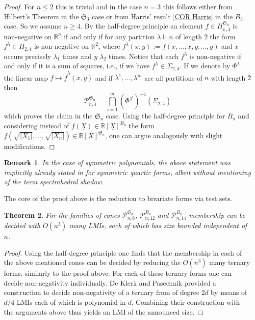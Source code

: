 \documentclass[11pt,a4paper]{amsart}
\numberwithin{equation}{section}
\newtheorem{thm}{Theorem}
\newtheorem{remark}[thm]{Remark}
\theoremstyle{definition}
\newcommand{\R}{\mathbb{R}}
\numberwithin{thm}{section}
\theoremstyle{break}
\numberwithin{subcase}{case}
\begin{document}
\begin{proof}
For $n \leq 2$ this is trivial and in the case $n=3$ this follows either from Hilbert's Theorem in the $\mathfrak{S}_3$ case or from Harris' result \ref{COR Harris} in the $B_3$ case.
So we assume $n\geq 4$. By the half-degree principle an element $f \in H_{n,4}^{\mathfrak{S}_n}$ is non-negative on $\R^n$ if and only if for any partition $\lambda \vdash n$ of length $2$ the form $f^\lambda \in H_{2,4}$ is non-negative on $\R^2$, where $f^\lambda(x,y):=f(x,\ldots,x,y,\ldots,y)$ and $x$ occurs precisely $\lambda_1$ times and $y$ $\lambda_2$ times. Notice that each $f^{\lambda}$ is non-negative if and only if it is a sum of squares, i.e., if we have $f^{\lambda}\in\Sigma_{2,4}$. If we denote by $\Phi^\lambda$ the linear map $f \mapsto \tilde{f}^\lambda (x,y)$ and if $\lambda^1,\ldots,\lambda^m$ are all partitions of $n$ with length $2$ then $$\mathcal{P}_{n,4}^{\mathfrak{S}_n} = \bigcap_{i=1}^m \left(\Phi^{\lambda^i} \right) ^{-1}(\Sigma_{2,4} )$$
which proves the claim in the $\mathfrak{S}_n$ case. 
Using the half-degree principle \cite[Theorem 3.1]{riener2016symmetric} for $B_n$ and considering instead of $f(\underline{X}) \in \R[\underline{X}]^{B_n}$ the form $f(\sqrt{|X_1|},\ldots,\sqrt{|X_n|})\in \R[\underline{X}]^{\mathfrak{S}_n}$, one can argue analogously with slight modifications. 
\end{proof}
\begin{remark}
In the case of symmetric polynomials, the above statement was implicitly already stated in \cite[Theorem 5.5]{riener2013exploiting} for symmetric quartic forms, albeit without mentioning of the term spectrahedral shadow.
\end{remark}
The core of the proof above is the reduction to bivariate forms via test sets. 

\begin{thm}
For the families of cones $\mathcal{P}_{n,6}^{\mathfrak{S}_n}$, $\mathcal{P}_{n,12}^{B_n}$ and $\mathcal{P}_{n,14}^{B_n}$ membership can be decided with $O(n^3)$ many LMIs, each of which has size bounded independent of $n$. 
\end{thm}
\begin{proof}
 Using the half-degree principle \cite[Theorem 3.1]{riener2016symmetric} one finds that the membership in each of the above mentioned cones can be decided by reducing the $O(n^3)$ many ternary forms, similarly to the proof above. For each of these  ternary forms one can decide non-negativity individually. De Klerk and Pasechnik \cite{deklerk} provided a construction to decide non-negativity of a ternary from of degree $2d$ by means of  $d/4$ LMIs each of which is polynomial in $d$. Combining their construction with the arguments above thus yields an LMI of the announced size.
\end{proof}
\end{document}
